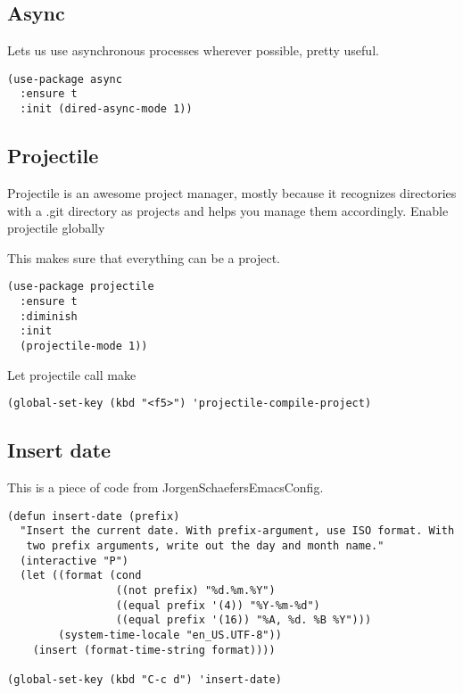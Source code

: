 \documentclass[12pt]{article}
\begin{document}
\subsection{Async}
\label{sec:orgdcd6436}

Lets us use asynchronous processes wherever possible, pretty useful.
\begin{verbatim}
(use-package async
  :ensure t
  :init (dired-async-mode 1))
\end{verbatim}

\subsection{Projectile}
\label{sec:org9caf993}

Projectile is an awesome project manager, mostly because it recognizes directories with a .git directory as projects and helps you manage them accordingly.
Enable projectile globally

This makes sure that everything can be a project.
\begin{verbatim}
(use-package projectile
  :ensure t
  :diminish
  :init
  (projectile-mode 1))
\end{verbatim}

Let projectile call make

\begin{verbatim}
(global-set-key (kbd "<f5>") 'projectile-compile-project)
\end{verbatim}

\subsection{Insert date}
\label{sec:org496599b}
This is a piece of code from JorgenSchaefersEmacsConfig.
\begin{verbatim}
(defun insert-date (prefix)
  "Insert the current date. With prefix-argument, use ISO format. With
   two prefix arguments, write out the day and month name."
  (interactive "P")
  (let ((format (cond
                 ((not prefix) "%d.%m.%Y")
                 ((equal prefix '(4)) "%Y-%m-%d")
                 ((equal prefix '(16)) "%A, %d. %B %Y")))
        (system-time-locale "en_US.UTF-8"))
    (insert (format-time-string format))))

(global-set-key (kbd "C-c d") 'insert-date)
\end{verbatim}
\end{document}

